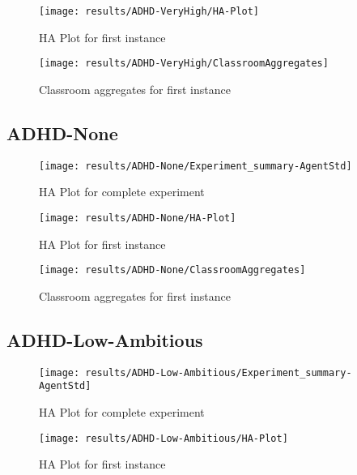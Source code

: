 \begin{figure}[H]
    \centering
    \texttt{[image: results/ADHD-VeryHigh/HA-Plot]}
    \caption{HA Plot for first instance}
\end{figure}

\begin{figure}[H]
    \centering
    \texttt{[image: results/ADHD-VeryHigh/ClassroomAggregates]}
    \caption{Classroom aggregates for first instance}
    \label{result:VH-Classroom}
\end{figure}


\subsection{ADHD-None}

\begin{figure}[H]
    \centering
    \texttt{[image: results/ADHD-None/Experiment\_summary-AgentStd]}
    \caption{HA Plot for complete experiment}
\end{figure}

\begin{figure}[H]
    \centering
    \texttt{[image: results/ADHD-None/HA-Plot]}
    \caption{HA Plot for first instance}
\end{figure}

\begin{figure}[H]
    \centering
    \texttt{[image: results/ADHD-None/ClassroomAggregates]}
    \caption{Classroom aggregates for first instance}
    \label{result:N-Classroom}
\end{figure}

\subsection{ADHD-Low-Ambitious}

\begin{figure}[H]
    \centering
    \texttt{[image: results/ADHD-Low-Ambitious/Experiment\_summary-AgentStd]}
    \caption{HA Plot for complete experiment}
\end{figure}

\begin{figure}[H]
    \centering
    \texttt{[image: results/ADHD-Low-Ambitious/HA-Plot]}
    \caption{HA Plot for first instance}
    \label{results:LA-HAPlot}
\end{figure}

